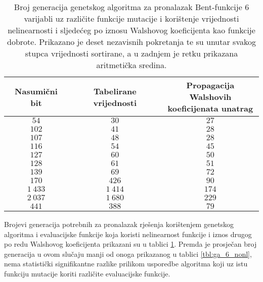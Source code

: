 \begin{table}[]
    \centering
    \captionsetup{justification=centering}
    \caption{Broj generacija genetskog algoritma za pronalazak Bent-funkcije $6$ varijabli uz različite funkcije mutacije i korištenje vrijednosti nelinearnosti i sljedećeg po iznosu Walshovog koeficijenta kao funkcije dobrote. Prikazano je deset nezavisnih pokretanja te su unutar svakog stupca vrijednosti sortirane, a u zadnjem je retku prikazana aritmetička sredina.}
    \begin{tabular}{ccc} \hline
        Nasumični bit & Tabelirane vrijednosti & \makecell{Propagacija Walshovih \\ koeficijenata unatrag} \\ \hline
            $54$ &     $30$ &  $27$ \\
           $102$ &     $41$ &  $28$ \\
           $107$ &     $48$ &  $28$ \\
           $116$ &     $54$ &  $45$ \\
           $127$ &     $60$ &  $50$ \\
           $128$ &     $61$ &  $51$ \\
           $139$ &     $69$ &  $72$ \\
           $170$ &    $426$ &  $90$ \\
        $1\:433$ & $1\:414$ & $174$ \\
        $2\:037$ & $1\:680$ & $229$ \\ \hline
           $441$ &    $388$ &  $79$
    \end{tabular}
    \label{tbl:ga_6_nonlV2}
\end{table}

Brojevi generacija potrebnih za pronalazak rješenja korištenjem genetskog algoritma i evaluacijske funkcije koja koristi nelinearnost funkcije i iznos drugog po redu Walshovog koeficijenta prikazani su u tablici \ref{tbl:ga_6_nonlV2}.
Premda je prosječan broj generacija u ovom slučaju manji od onoga prikazanog u tablici \ref{tbl:ga_6_nonl}, nema statistički signifikantne razlike prilikom usporedbe algoritma koji uz istu funkciju mutacije koriti različite evaluacijske funkcije.

